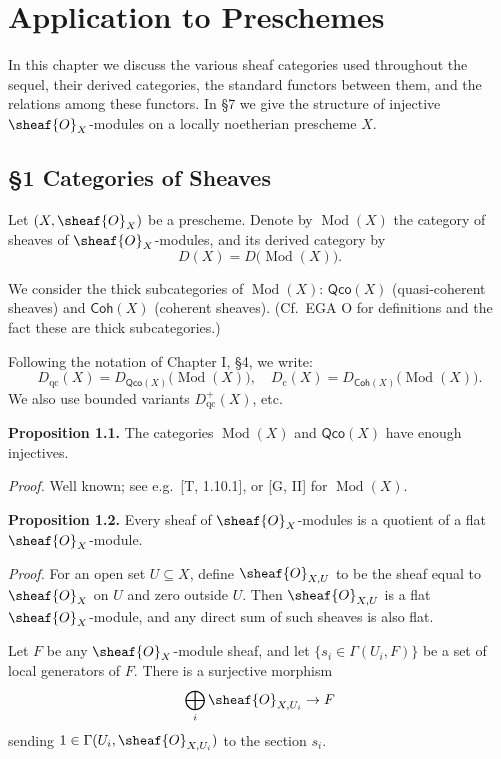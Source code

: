 \setcounter{page}{85}
\chapter{Application to Preschemes}

In this chapter we discuss the various sheaf categories used throughout the sequel, their derived categories, the standard functors between them, and the relations among these functors. In \S7 we give the structure of injective \(\sheaf{O}_X\)-modules on a locally noetherian prescheme \(X\).

\section{\S1 Categories of Sheaves}

Let \((X,\sheaf{O}_X)\) be a prescheme. Denote by \(\operatorname{Mod}(X)\) the category of sheaves of \(\sheaf{O}_X\)-modules, and its derived category by
\[
D(X) = D\big(\operatorname{Mod}(X)\big).
\]

We consider the thick subcategories of \(\operatorname{Mod}(X)\):
\(\mathsf{Qco}(X)\) (quasi-coherent sheaves) and \(\mathsf{Coh}(X)\) (coherent sheaves).
(Cf.\ EGA O for definitions and the fact these are thick subcategories.)

Following the notation of Chapter I, \S4, we write:
\[
D_{\mathrm{qc}}(X) = D_{\mathsf{Qco}(X)}\big(\operatorname{Mod}(X)\big),\quad
D_{\mathrm{c}}(X) = D_{\mathsf{Coh}(X)}\big(\operatorname{Mod}(X)\big).
\]
We also use bounded variants \(D_{\mathrm{qc}}^+(X)\), etc.

\textbf{Proposition 1.1.}
The categories \(\operatorname{Mod}(X)\) and \(\mathsf{Qco}(X)\) have enough injectives.

\setcounter{page}{86}
\textit{Proof.}
Well known; see e.g.\ [T, 1.10.1], or [G, II] for \(\operatorname{Mod}(X)\).

\textbf{Proposition 1.2.}
Every sheaf of \(\sheaf{O}_X\)-modules is a quotient of a flat \(\sheaf{O}_X\)-module.

\textit{Proof.}
For an open set \(U\subseteq X\), define \(\sheaf{O}_{X,U}\) to be the sheaf equal to \(\sheaf{O}_X\) on \(U\) and zero outside \(U\).
Then \(\sheaf{O}_{X,U}\) is a flat \(\sheaf{O}_X\)-module, and any direct sum of such sheaves is also flat.

Let \(F\) be any \(\sheaf{O}_X\)-module sheaf, and let \(\{s_i\in\Gamma(U_i,F)\}\) be a set of local generators of \(F\).
There is a surjective morphism
\[
\bigoplus_i \sheaf{O}_{X,U_i} \to F
\]
sending \(1\in\Gamma(U_i,\sheaf{O}_{X,U_i})\) to the section \(s_i\).